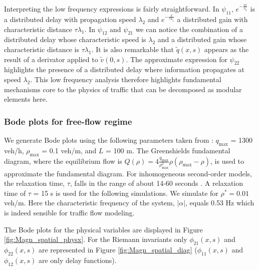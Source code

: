 \documentclass[5p,twocolumn]{elsarticle}
\begin{document}
Interpreting the low frequency expressions is fairly straightforward.
In $\psi_{11}$, $e^{-\frac{sx}{\lambda_{2}}}$ is a distributed delay with propagation speed $\lambda_{2}$ and $e^{-\frac{x}{\tau\lambda_{1}}}$ a distributed gain with characteristic distance $\tau\lambda_{1}$. 
In $\psi_{12}$ and $\psi_{21}$ we can notice the combination of a distributed delay whose  characteristic speed is $\lambda_{2}$ and a distributed gain whose characteristic distance is $\tau\lambda_{1}$. It is also remarkable that $\widetilde{q}(x,s)$ appears as the result of a derivator applied to $\widetilde{v}(0,s)$.
The approximate expression for $\psi_{22}$ highlights the presence of a distributed delay where information propagates at speed $\lambda_{2}$. This low frequency analysis therefore highlights fundamental mechanisms core to the physics of traffic that can be decomposed as modular elements here.

\subsubsection{Bode plots for free-flow regime}

We generate Bode plots using the following parameters taken from \cite{Hofleitner}: $q_{\text{max}}$ = 1300 veh/h, $\rho_{\text{max}}$ = 0.1 veh/m, and $L$ = 100 m. The Greenshields fundamental diagram, where the equilibrium flow is $Q(\rho) = 4 \frac{q_{\text{max}}}{\rho_{\text{max}}^2}\rho (\rho_{\text{max}} - \rho)$, is used to approximate the fundamental diagram. For inhomogeneous second-order models, the relaxation time, $\tau$, falls in the range of about 14-60 seconds \cite{Fan}. A relaxation time of $\tau$ = 15 s is used for the following simulations. We simulate for $\rho^* = 0.01$ veh/m. Here the characteristic frequency of the system, $\left|\alpha\right|$, equals 0.53 Hz which is indeed sensible for traffic flow modeling.

The Bode plots for the physical variables are displayed in Figure \ref{fig:Magn_spatial_physx}.
For the Riemann invariants only $\phi_{21}(x,s)$ and $\phi_{22}(x,s)$ are represented in Figure \ref{fig:Magn_spatial_diag} ($\phi_{11}(x,s)$ and $\phi_{12}(x,s)$ are only delay functions).
\end{document}
